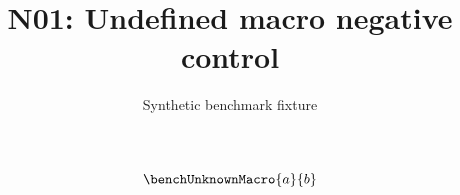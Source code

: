 \documentclass{article}
\title{N01: Undefined macro negative control}
\author{Synthetic benchmark fixture}
\date{}
\begin{document}
\maketitle
\[\benchUnknownMacro{a}{b}\]
\end{document}
